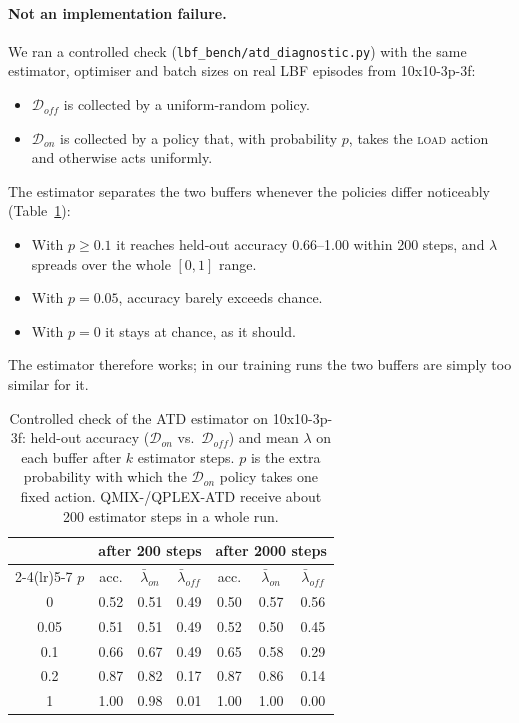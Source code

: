 \paragraph{Not an implementation failure.} We ran a controlled check
(\texttt{lbf\_bench/atd\_diagnostic.py}) with the same estimator, optimiser and batch sizes on real
LBF episodes from 10x10-3p-3f:
\begin{itemize}
  \item $\mathcal{D}_{off}$ is collected by a uniform-random policy.
  \item $\mathcal{D}_{on}$ is collected by a policy that, with probability $p$, takes the
        \textsc{load} action and otherwise acts uniformly.
\end{itemize}
The estimator separates the two buffers whenever the policies differ noticeably
(Table~\ref{tab:diag}):
\begin{itemize}
  \item With $p\ge0.1$ it reaches held-out accuracy 0.66--1.00 within 200 steps, and $\lambda$
        spreads over the whole $[0,1]$ range.
  \item With $p=0.05$, accuracy barely exceeds chance.
  \item With $p=0$ it stays at chance, as it should.
\end{itemize}
The estimator therefore works; in our training runs the two buffers are simply too similar for
it.

\begin{table}[t]
\centering
\caption{Controlled check of the ATD estimator on 10x10-3p-3f: held-out accuracy
($\mathcal{D}_{on}$ vs.\ $\mathcal{D}_{off}$) and mean $\lambda$ on each buffer after $k$ estimator
steps. $p$ is the extra probability with which the $\mathcal{D}_{on}$ policy takes one fixed action.
QMIX-/QPLEX-ATD receive about 200 estimator steps in a whole run.}
\label{tab:diag}
\small
\begin{tabular}{c ccc ccc}
\toprule
 & \multicolumn{3}{c}{after 200 steps} & \multicolumn{3}{c}{after 2000 steps} \\
\cmidrule(lr){2-4}\cmidrule(lr){5-7}
$p$ & acc. & $\bar\lambda_{on}$ & $\bar\lambda_{off}$ & acc. & $\bar\lambda_{on}$ & $\bar\lambda_{off}$ \\
\midrule
0    & 0.52 & 0.51 & 0.49 & 0.50 & 0.57 & 0.56 \\
0.05 & 0.51 & 0.51 & 0.49 & 0.52 & 0.50 & 0.45 \\
0.1  & 0.66 & 0.67 & 0.49 & 0.65 & 0.58 & 0.29 \\
0.2  & 0.87 & 0.82 & 0.17 & 0.87 & 0.86 & 0.14 \\
1    & 1.00 & 0.98 & 0.01 & 1.00 & 1.00 & 0.00 \\
\bottomrule
\end{tabular}
\end{table}

